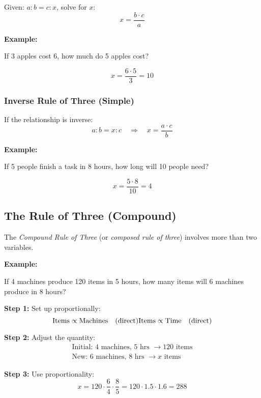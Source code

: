 Given: \(a : b = c : x\), solve for \(x\):
\[
x = \frac{b \cdot c}{a}
\]

\textbf{Example:}
\vspace{\baselineskip}
 
If 3 apples cost 6, how much do 5 apples cost?

\[
x = \frac{6 \cdot 5}{3} = 10
\]

\subsubsection{Inverse Rule of Three (Simple)}

If the relationship is inverse:
\[
a : b = x : c \quad \Rightarrow \quad x = \frac{a \cdot c}{b}
\]

\textbf{Example:}
\vspace{\baselineskip}
 
If 5 people finish a task in 8 hours, how long will 10 people need?

\[
x = \frac{5 \cdot 8}{10} = 4
\]

\subsection{The Rule of Three (Compound)}

The \emph{Compound Rule of Three} (or \emph{composed rule of three}) involves more than two variables.
\vspace{\baselineskip}

\textbf{Example:}
\vspace{\baselineskip}
 
If 4 machines produce 120 items in 5 hours, how many items will 6 machines produce in 8 hours?
\vspace{\baselineskip}

\textbf{Step 1:} Set up proportionally:
\[
\text{Items} \propto \text{Machines} \quad (\text{direct}) \\
\text{Items} \propto \text{Time} \quad (\text{direct})
\]

\textbf{Step 2:} Adjust the quantity:
\begin{align*}
\text{Initial: } 4 \text{ machines, } 5 \text{ hrs } \rightarrow 120 \text{ items} \\
\text{New: } 6 \text{ machines, } 8 \text{ hrs } \rightarrow x \text{ items}
\end{align*}

\textbf{Step 3:} Use proportionality:
\[
x = 120 \cdot \frac{6}{4} \cdot \frac{8}{5} = 120 \cdot 1.5 \cdot 1.6 = 288
\]

